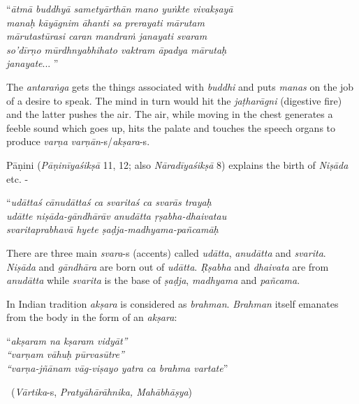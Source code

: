 \begin{longquote}
“\textit{ātmā buddhyā sametyārthān mano yuṅkte vivakṣayā }\\ \textit{manaḥ kāyāgnim āhanti sa prerayati mārutam }\\ \textit{mārutastūrasi caran mandraṁ janayati svaram }\\ \textit{so’dīrṇo mūrdhnyabhihato vaktram āpadya mārutaḥ }\\ \textit{janayate}... ”
\end{longquote}

The \textit{antaraṅga} gets the things associated with \textit{buddhi} and puts \textit{manas} on the job of a desire to speak. The mind in turn would hit the \textit{jaṭharāgni} (digestive fire) and the latter pushes the air. The air, while moving in the chest generates a feeble sound which goes up, hits the palate and touches the speech organs to produce \textit{varṇa} \textit{varṇān}-s/\textit{akṣara}-s.

Pāṇini (\textit{Pāṇinīyaśikṣā} 11, 12; also \textit{Nāradīyaśikṣā} 8) explains the birth of \textit{Niṣāda} etc. -

\begin{longquote}
“\textit{udāttaś cānudāttaś ca svaritaś ca svarās trayaḥ }\\ \textit{udātte niṣāda-gāndhārāv anudātta ṛṣabha-dhaivatau }\\\textit{svaritaprabhavā hyete ṣaḍja-madhyama-pañcamāḥ} 
\end{longquote}

There are three main \textit{svara}-s (accents) called \textit{udātta}, \textit{anudātta} and \textit{svarita}. \textit{Niṣāda} and \textit{gāndhāra} are born out of \textit{udātta}. \textit{Ṛṣabha} and \textit{dhaivata} are from \textit{anudātta} while \textit{svarita} is the base of \textit{ṣaḍja}, \textit{madhyama} and \textit{pañcama}.

In Indian tradition \textit{akṣara} is considered as \textit{brahman}. \textit{Brahman} itself emanates from the body in the form of an \textit{akṣara}:

\newpage

\begin{longquote}
“\textit{akṣaram na kṣaram vidyāt”}\\ \textit{“varṇam vāhuḥ pūrvasūtre”}\\ \textit{“varṇa-jñānam vāg-viṣayo yatra ca brahma vartate}” 

~\hfill (\textit{Vārtika}-s, \textit{Pratyāhārāhnika, Mahābhāṣya})
\end{longquote}

